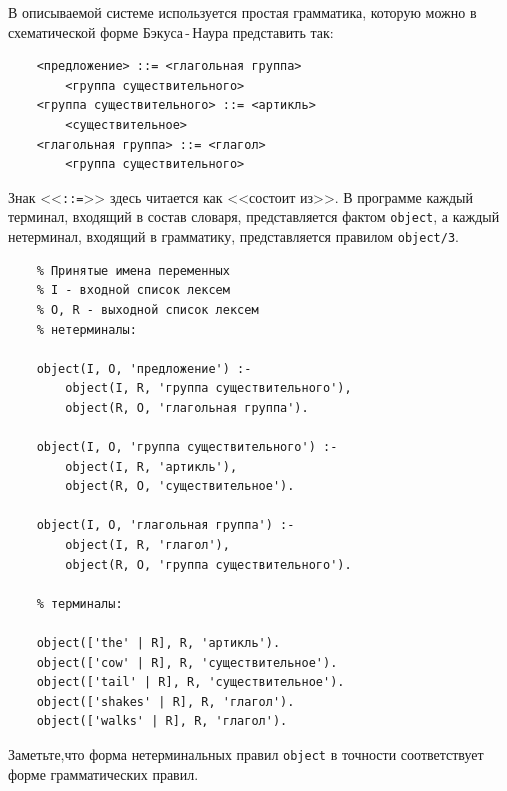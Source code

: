 \documentclass[12pt, openany, twoside]{book} %
\begin{document}
В описываемой системе используется простая грамматика, которую можно в схематической форме Бэкуса\,{}-\,{}Наура представить так:
{\tt\begin{verbatim}
    <предложение> ::= <глагольная группа>
        <группа существительного>
    <группа существительного> ::= <артикль>
        <существительное>
    <глагольная группа> ::= <глагол>
        <группа существительного>
\end{verbatim}}

Знак <<{\tt ::=}>> здесь читается как <<состоит из>>. В программе каждый терминал, входящий в состав словаря, представляется фактом {\tt object}, а каждый нетерминал, входящий в грамматику, представляется правилом {\tt object/3}.
{\tt\begin{verbatim}
    % Принятые имена переменных
    % I - входной список лексем
    % О, R - выходной список лексем
    % нетерминалы:

    object(I, О, 'предложение') :-
        object(I, R, 'группа существительного'),
        object(R, О, 'глагольная группа').

    object(I, О, 'группа существительного') :-
        object(I, R, 'артикль'),
        object(R, О, 'существительное').

    object(I, О, 'глагольная группа') :-
        object(I, R, 'глагол'),
        object(R, О, 'группа существительного').

    % терминалы:

    object(['the' | R], R, 'артикль').
    object(['cow' | R], R, 'существительное').
    object(['tail' | R], R, 'существительное').
    object(['shakes' | R], R, 'глагол').
    object(['walks' | R], R, 'глагол').
\end{verbatim}}

\noindent Заметьте,что форма нетерминальных правил {\tt object} в точности соответствует форме грамматических правил.
\end{document}

